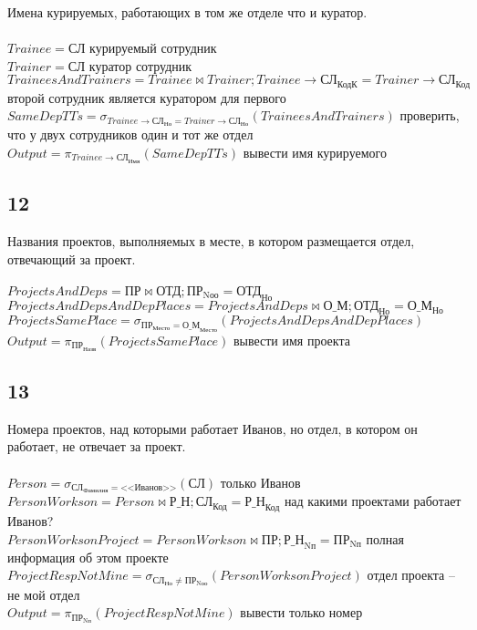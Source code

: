 \documentclass[12pt]{article}
\newcommand{\employee}{\textbf{СЛ}}
\newcommand{\department}{\textbf{ОТД}}
\newcommand{\depplace}{\textbf{О\_М}}
\newcommand{\project}{\textbf{ПР}}
\newcommand{\workson}{\textbf{Р\_Н}}
\newcommand{\employeeName}{\textbf{СЛ}_\text{Имя}}
\newcommand{\employeeLastname}{\textbf{СЛ}_\text{Фамилия}}
\newcommand{\employeeId}{\textbf{СЛ}_\text{Код}}
\newcommand{\employeeDepId}{\textbf{СЛ}_\text{Но}}
\newcommand{\employeeCuratorId}{\textbf{СЛ}_\text{КодК}}
\newcommand{\departmentId}{\textbf{ОТД}_\text{Но}}
\newcommand{\depplaceDep}{\textbf{О\_М}_\text{Но}}
\newcommand{\depplacePlace}{\textbf{О\_М}_\text{Место}}
\newcommand{\projectName}{\textbf{ПР}_\text{Назв}}
\newcommand{\projectId}{\textbf{ПР}_\text{Nп}}
\newcommand{\projectPlace}{\textbf{ПР}_\text{Место}}
\newcommand{\projectResponsibleDepId}{\textbf{ПР}_\text{Nоо}}
\newcommand{\worksonEmpId}{\textbf{Р\_Н}_\text{Код}}
\newcommand{\worksonProjId}{\textbf{Р\_Н}_\text{Nп}}
\newcommand{\filter}[2]{\sigma{}_{#1} \allowbreak \left( #2 \right)}
\newcommand{\join}[3]{ #1 \bowtie #2;\allowbreak #3 }
\newcommand{\select}[2]{\pi_{#1} \allowbreak \left( #2 \right)}
\begin{document}
Имена курируемых, работающих в том же отделе что и куратор.\\\\
$ Trainee = \employee$ 
 курируемый сотрудник   \\ 
$ Trainer = \employee$ 
 куратор сотрудник   \\ 
$ TraineesAndTrainers = \join{Trainee}{Trainer}{Trainee\rightarrow\employeeCuratorId = Trainer\rightarrow\employeeId}$ 
 второй сотрудник является куратором для первого  \\ 
$ SameDepTTs = \filter{Trainee\rightarrow\employeeDepId = Trainer\rightarrow\employeeDepId}{TraineesAndTrainers}$ 
  проверить, что у двух сотрудников один и тот же отдел  \\ 
$ Output = \select{Trainee\rightarrow\employeeName}{SameDepTTs}$ 
   вывести имя курируемого \\ 

\subsection{12}

Названия проектов, выполняемых в месте, в котором размещается отдел, отвечающий за проект.\\\\
$ ProjectsAndDeps = \join{\project}{\department}{\projectResponsibleDepId = \departmentId}$ 
    \\ 
$ ProjectsAndDepsAndDepPlaces = \join{ProjectsAndDeps}{\depplace}{\departmentId = \depplaceDep}$ 
    \\ 
$ ProjectsSamePlace = \filter{\projectPlace = \depplacePlace}{ProjectsAndDepsAndDepPlaces}$ 
    \\ 
$ Output = \select{\projectName}{ProjectsSamePlace}$ 
  вывести имя проекта  \\ 

\subsection{13}

Номера проектов, над которыми работает Иванов, но отдел, в котором он работает, не отвечает за проект.\\\\
$ Person = \filter{\employeeLastname = \text{<<Иванов>>}}{\employee} $ 
 только Иванов \\ 
$ PersonWorkson = \join{Person}{\workson}{\employeeId = \worksonEmpId}$ 
 над какими проектами работает Иванов? \\ 
$ PersonWorksonProject = \join{PersonWorkson}{\project}{\worksonProjId = \projectId}$ 
 полная информация об этом проекте \\ 
$ ProjectRespNotMine = \filter{\employeeDepId \neq \projectResponsibleDepId}{PersonWorksonProject}$ 
 отдел проекта -- не мой отдел \\ 
$ Output = \select{\projectId}{ProjectRespNotMine}$ 
 вывести только номер \\ 
\end{document}
